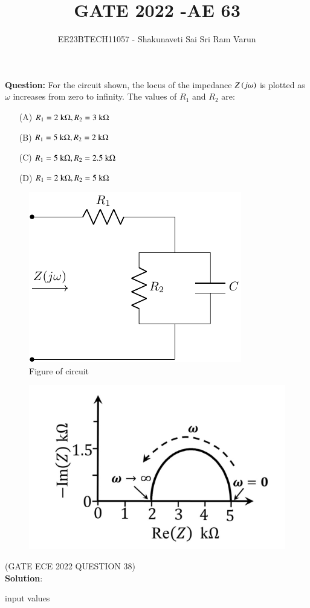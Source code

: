 \documentclass[journal,12pt,twocolumn]{IEEEtran}
\theoremstyle{remark}
\begin{document}

\vspace{3cm}

\title{GATE 2022  -AE 63}
\author{EE23BTECH11057 - Shakunaveti Sai Sri Ram Varun$^{}$%
}
\maketitle
\newpage
\bigskip
\vspace{2cm}
\textbf{Question: }
For the circuit shown, the locus of the impedance $ Z\left(j\omega\right)$ is plotted as $ \omega$ increases from zero to infinity. The values of $ R_1$ and $ R_2$ are:
\begin{enumerate}
    \item[(A)] $ R_1 = 2\text{ k\ohm}, R_2 = 3\text{ k\ohm}$
    \item[(B)]$ R_1 = 5\text{ k\ohm}, R_2 = 2\text{ k\ohm}$
    \item[(C)] $ R_1 = 5\text{ k\ohm}, R_2 = 2.5\text{ k\ohm}$
    \item[(D)] $ R_1 = 2\text{ k\ohm}, R_2 = 5\text{ k\ohm}$
\end{enumerate}

\begin{figure}[h!]
    \includegraphics[width = 0.6\columnwidth]{figs/qn_fig.pdf}
    \caption{Figure of circuit}
    \centering
    \label{fig: ece38_qn_fig}
\end{figure}

\begin{figure}[h!]
    \includegraphics[width = 0.6\columnwidth]{figs/fig_2.png}
    \caption{}
    \centering
    \label{fig: ece38qn_2_fig}
\end{figure}
\hfill(GATE ECE 2022 QUESTION 38)\\
\textbf{Solution}:\\
\begin{table}[h!] 
\centering

\caption{input values}
\label{tab: Table2022ECE38}
\end{table}
\end{document}
